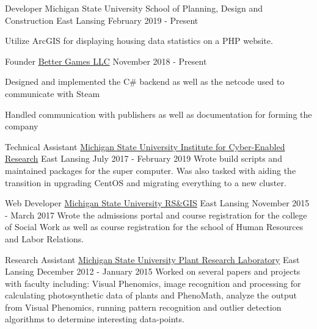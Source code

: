 
\begin{cventries}
  \cventry
  {Developer}
  {Michigan State University School of Planning, Design and Construction}
  {East Lansing}
  {February 2019 - Present}
  {
    \begin{cvitems}
      \item {Utilize ArcGIS for displaying housing data statistics on a PHP website.}
    \end{cvitems}
  }

  \cventry
    {Founder} %
    {\href{https://better-games.org}{Better Games LLC}} %
    {} %
    {November 2018 - Present} %
    {
        \begin{cvitems}
          \item {Designed and implemented the C\# backend as well as the netcode used to communicate with Steam}
          \item {Handled communication with publishers as well as documentation for forming the company}
        \end{cvitems}
    }

  \cventry
    {Technical Assistant}
    {\href{https://icer.msu.edu}{Michigan State University Institute for Cyber-Enabled Research}}
    {East Lansing}
    {July 2017 - February 2019}
    {
        {Wrote build scripts and maintained packages for the super computer. Was also tasked with aiding the transition
        in upgrading CentOS and migrating everything to a new cluster.}
    }

  \cventry
    {Web Developer}
    {\href{http://www.rsgis.msu.edu}{Michigan State University RS\&GIS}}
    {East Lansing}
    {November 2015 - March 2017}
    {
      {Wrote the admissions portal and course registration for the college of Social Work as well as
      course registration for the school of Human Resources and Labor Relations.}
    }

  \cventry
    {Research Assistant}
    {\href{https://prl.natsci.msu.edu/research-tech/center-for-advanced-algal-and-plant-phenotyping}{Michigan State University Plant Research Laboratory}}
    {East Lansing}
    {December 2012 - January 2015}
    {
      {Worked on several papers and projects with faculty including: Visual Phenomics, image recognition
      and processing for calculating photosynthetic data of plants and PhenoMath, analyze the output from Visual Phenomics,
      running pattern recognition and outlier detection algorithms to determine interesting data-points. }
    }
\end{cventries}
